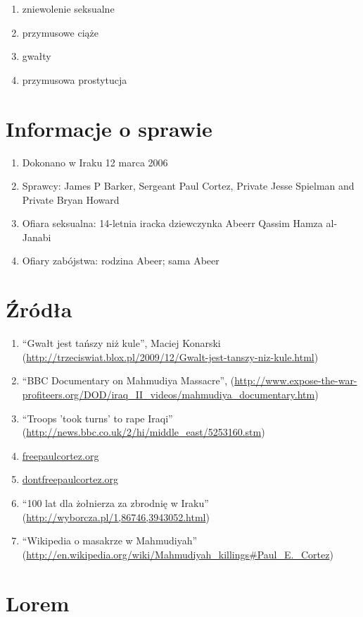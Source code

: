 \documentclass[12pt,a4paper]{article}
\begin{document}
\begin{enumerate}
\item zniewolenie seksualne
\item przymusowe ciąże
\item gwałty
\item przymusowa prostytucja
\end{enumerate}

\section{Informacje o sprawie}

\begin{enumerate}
\item Dokonano w Iraku 12 marca 2006
\item Sprawcy: James P Barker, Sergeant Paul Cortez, Private Jesse Spielman and Private Bryan Howard
\item Ofiara seksualna: 14-letnia iracka dziewczynka Abeerr Qassim Hamza al-Janabi
\item Ofiary zabójstwa: rodzina Abeer; sama Abeer
\end{enumerate}

\section{Źródła}


\begin{enumerate}
\item ``Gwałt jest tańszy niż kule'', Maciej Konarski (\url{http://trzeciswiat.blox.pl/2009/12/Gwalt-jest-tanszy-niz-kule.html})
\item ``BBC Documentary on Mahmudiya Massacre'',
  (\url{http://www.expose-the-war-profiteers.org/DOD/iraq_II_videos/mahmudiya_documentary.htm})
\item ``Troops 'took turns' to rape Iraqi'' (\url{http://news.bbc.co.uk/2/hi/middle_east/5253160.stm})
\item \url{freepaulcortez.org}
\item \url{dontfreepaulcortez.org}
\item ``100 lat dla żołnierza za zbrodnię w Iraku'' (\url{http://wyborcza.pl/1,86746,3943052.html})
\item ``Wikipedia o masakrze w Mahmudiyah'' (\url{http://en.wikipedia.org/wiki/Mahmudiyah_killings#Paul_E._Cortez})
\end{enumerate}

\section{Lorem}
\end{document}
